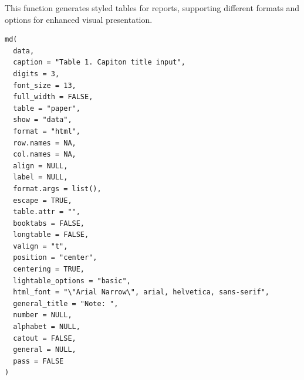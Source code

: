 \documentclass[a4paper]{book}
\begin{document}
%
\begin{Description}
This function generates styled tables for reports, supporting different formats and options for enhanced visual presentation.
\end{Description}
%
\begin{Usage}
\begin{verbatim}
md(
  data,
  caption = "Table 1. Capiton title input",
  digits = 3,
  font_size = 13,
  full_width = FALSE,
  table = "paper",
  show = "data",
  format = "html",
  row.names = NA,
  col.names = NA,
  align = NULL,
  label = NULL,
  format.args = list(),
  escape = TRUE,
  table.attr = "",
  booktabs = FALSE,
  longtable = FALSE,
  valign = "t",
  position = "center",
  centering = TRUE,
  lightable_options = "basic",
  html_font = "\"Arial Narrow\", arial, helvetica, sans-serif",
  general_title = "Note: ",
  number = NULL,
  alphabet = NULL,
  catout = FALSE,
  general = NULL,
  pass = FALSE
)
\end{verbatim}
\end{Usage}
%
\end{document}

